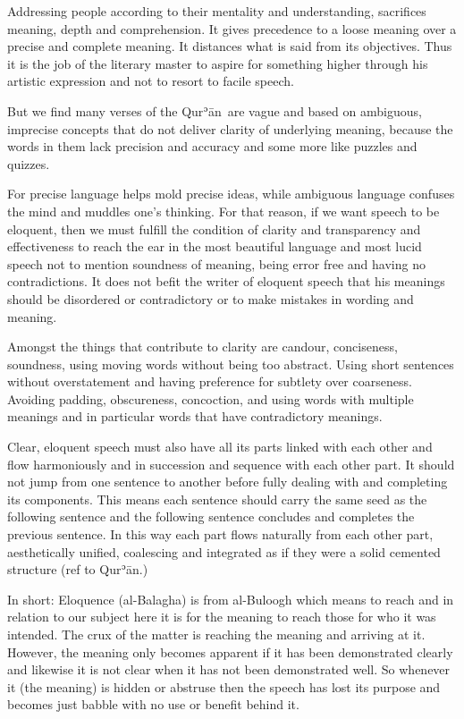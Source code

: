 \documentclass[12pt]{memoir}
\def\´{ʾ} %
\def \Quran{Qur\-\´ān} %
\begin{document}
Addressing people according to their mentality and understanding,
sacrifices meaning, depth and comprehension.
It gives precedence to a loose meaning over a precise and complete meaning.
It distances what is said from its objectives.
Thus it is the job of the literary master to aspire for something higher
through his artistic expression and not to resort to facile speech.

But we find many verses of the \Quran\ are vague and based on ambiguous,
imprecise concepts that do not deliver clarity of underlying meaning,
because the words in them lack precision and accuracy
and some more like puzzles and quizzes.

For precise language helps mold precise ideas,
while ambiguous language confuses the mind and muddles one’s thinking.
For that reason, if we want speech to be eloquent,
then we must fulfill the condition of clarity and transparency
and effectiveness to reach the ear in the most beautiful language
and most lucid speech not to mention soundness of meaning,
being error free and having no contradictions.
It does not befit the writer of eloquent speech
that his meanings should be disordered or contradictory
or to make mistakes in wording and meaning.

Amongst the things that contribute to clarity are candour, conciseness,
soundness, using moving words without being too abstract.
Using short sentences without overstatement
and having preference for subtlety over coarseness.
Avoiding padding, obscureness, concoction,
and using words with multiple meanings and in particular words
that have contradictory meanings.

Clear, eloquent speech must also have all its parts linked
with each other and flow harmoniously and in succession
and sequence with each other part.
It should not jump from one sentence to another
before fully dealing with and completing its components.
This means each sentence should carry the same seed as the following sentence
and the following sentence concludes and completes the previous sentence.
In this way each part flows naturally from each other part,
aesthetically unified, coalescing and integrated
as if they were a solid cemented structure (ref to \Quran.)

In short: Eloquence (al-Balagha) is from al-Buloogh which means
to reach and in relation to our subject here it is for the meaning
to reach those for who it was intended.
The crux of the matter is reaching the meaning and arriving at it.
However, the meaning only becomes apparent if it has been demonstrated clearly
and likewise it is not clear when it has not been demonstrated well.
So whenever it (the meaning) is hidden or abstruse
then the speech has lost its purpose and becomes just babble
with no use or benefit behind it.
\end{document}

